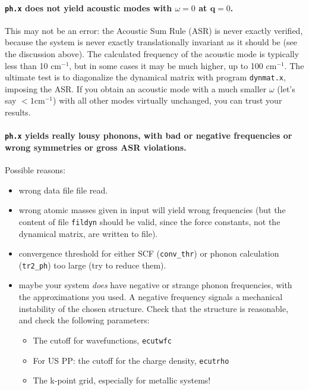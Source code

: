 \documentclass[12pt,a4paper]{article}
\begin{document}
\paragraph{\texttt{ph.x} does not yield acoustic modes with $\omega=0$
           at $\mathbf{q}=0$.}

This may not be an error: the Acoustic Sum Rule (ASR) is never exactly
verified, because the system is never exactly translationally
invariant as it should be (see the discussion above).
The calculated frequency of the acoustic mode is typically less than
10 cm$^{-1}$, but in some cases it may be much higher, up to 100
cm$^{-1}$.
The ultimate test is to diagonalize the dynamical matrix with program
\texttt{dynmat.x}, imposing the ASR.
If you obtain an acoustic mode with a much smaller $\omega$ (let's say
$<1 \textrm{cm}^{-1}$) with all other modes virtually unchanged, you
can trust your results.

\paragraph{\texttt{ph.x} yields really lousy phonons, with bad or
           negative frequencies or wrong symmetries or gross ASR
           violations.}

Possible reasons:
\begin{itemize}
  \item
    wrong data file file read.
  \item
    wrong atomic masses given in input will yield wrong frequencies
    (but the content of file {\tt fildyn} should be valid, since the
    force constants, not the dynamical matrix, are written to file).
  \item
    convergence threshold for either SCF ({\tt conv\_thr}) or phonon
    calculation ({\tt tr2\_ph}) too large (try to reduce them).
  \item
    maybe your system \emph{does} have negative or strange phonon
    frequencies, with the approximations you used.
    A negative frequency signals a mechanical instability of the
    chosen structure.
    Check that the structure is reasonable, and check the following
    parameters:
    \begin{itemize}
      \item The cutoff for wavefunctions, \texttt{ecutwfc}
      \item For US PP: the cutoff for the charge density,
            \texttt{ecutrho}
      \item The k-point grid, especially for metallic systems!
    \end{itemize}
\end{itemize}
\end{document}
